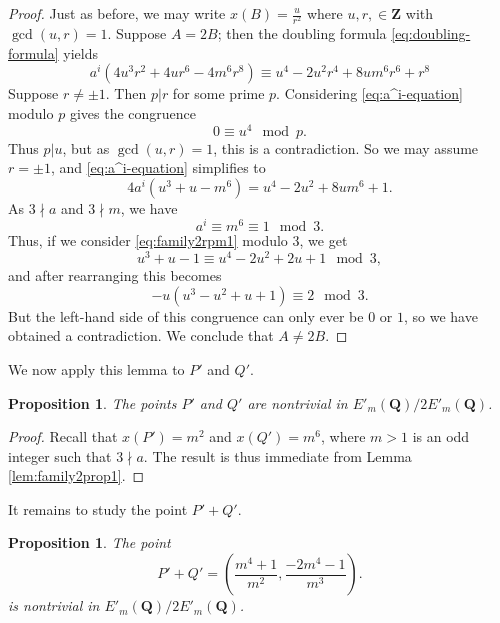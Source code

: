 \documentclass{amsart}
\newtheorem{proposition}[theorem]{Proposition}
\numberwithin{equation}{section}
\theoremstyle{remark}
\newcommand{\Z}{\mathbf{Z}}
\newcommand{\Q}{\mathbf{Q}}
\begin{document}
\begin{proof}
Just as before, we may write $x(B)=\frac{u}{r^2}$ where $u,r, \in \Z$ with $\gcd(u,r)=1$. Suppose $A=2B$; then the doubling formula \eqref{eq:doubling-formula} yields
\begin{equation}\label{eq:a^i-equation}
a^i(4u^3r^2+4ur^6-4m^6r^8) \equiv u^4 - 2u^2r^4+8um^6r^6 + r^8
\end{equation}
Suppose $r \neq \pm 1$. Then $p|r$ for some prime $p$. Considering \eqref{eq:a^i-equation} modulo $p$ gives the congruence
\[
0 \equiv u^4 \mod p.
\]
Thus $p|u$, but as $\gcd(u,r) = 1$, this is a contradiction. So we may assume $r = \pm 1$, and \eqref{eq:a^i-equation} simplifies to
\begin{equation}\label{eq:family2rpm1}
4a^i(u^3+u-m^6) = u^4 - 2u^2+8um^6 + 1.
\end{equation}
As $3 \nmid a$ and $3\nmid m$, we have $$a^i \equiv m^6 \equiv 1 \mod 3.$$ Thus, if we consider \eqref{eq:family2rpm1} modulo 3, we get
\[
u^3 + u - 1 \equiv u^4 - 2u^2 + 2u + 1 \mod 3,
\]
and after rearranging this becomes
\[
-u(u^3-u^2+u+1)\equiv 2 \mod 3.
\]
But the left-hand side of this congruence can only ever be $0$ or $1$, so we have obtained a
contradiction. We conclude that $A \neq 2B$.
\end{proof}

We now apply this lemma to $P'$ and $Q'$.

\begin{proposition}\label{prop:family2prop1}
The points $P'$ and $Q'$ are nontrivial in $E'_m(\Q)/2E'_m(\Q)$.
\end{proposition}
\begin{proof}
Recall that $x(P')=m^2$ and $x(Q')=m^6$, where $m>1$ is an odd integer such that $3 \nmid a$. The result is thus immediate from Lemma \ref{lem:family2prop1}.
\end{proof}

It remains to study the point
$P'+Q'$.

\begin{proposition}\label{prop:family2prop-pq}
The point
\[
P'+Q'=\left( \frac{m^4+1}{m^2}, \frac{-2m^4 - 1}{m^3} \right).
\]
is nontrivial in $E'_m(\Q)/2E'_m(\Q)$.
\end{proposition}
\end{document}
